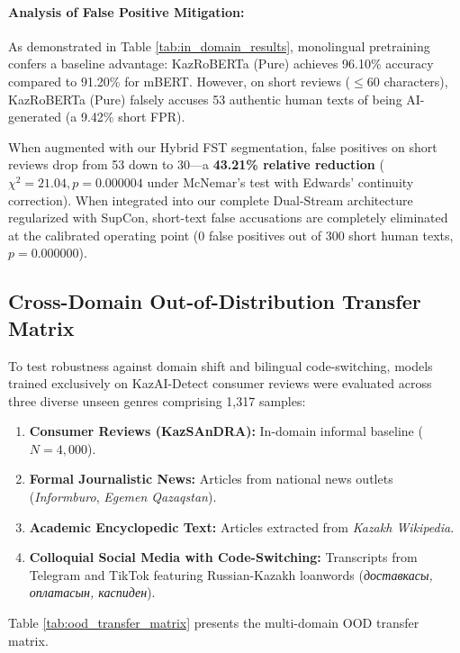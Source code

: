 \paragraph{Analysis of False Positive Mitigation:}
As demonstrated in Table \ref{tab:in_domain_results}, monolingual pretraining confers a baseline advantage: KazRoBERTa (Pure) achieves 96.10\% accuracy compared to 91.20\% for mBERT. However, on short reviews ($\le 60$ characters), KazRoBERTa (Pure) falsely accuses 53 authentic human texts of being AI-generated (a 9.42\% short FPR). 

When augmented with our Hybrid FST segmentation, false positives on short reviews drop from 53 down to 30---a \textbf{43.21\% relative reduction} ($\chi^2 = 21.04, p = 0.000004$ under McNemar's test with Edwards' continuity correction). When integrated into our complete Dual-Stream architecture regularized with SupCon, short-text false accusations are completely eliminated at the calibrated operating point (0 false positives out of 300 short human texts, $p = 0.000000$).

\subsection{Cross-Domain Out-of-Distribution Transfer Matrix}
To test robustness against domain shift and bilingual code-switching, models trained exclusively on KazAI-Detect consumer reviews were evaluated across three diverse unseen genres comprising 1,317 samples:
\begin{enumerate}
    \item \textbf{Consumer Reviews (KazSAnDRA):} In-domain informal baseline ($N=4,000$).
    \item \textbf{Formal Journalistic News:} Articles from national news outlets (\textit{Informburo}, \textit{Egemen Qazaqstan}).
    \item \textbf{Academic Encyclopedic Text:} Articles extracted from \textit{Kazakh Wikipedia}.
    \item \textbf{Colloquial Social Media with Code-Switching:} Transcripts from Telegram and TikTok featuring Russian-Kazakh loanwords (\textit{доставкасы, оплатасын, каспиден}).
\end{enumerate}

Table \ref{tab:ood_transfer_matrix} presents the multi-domain OOD transfer matrix.

